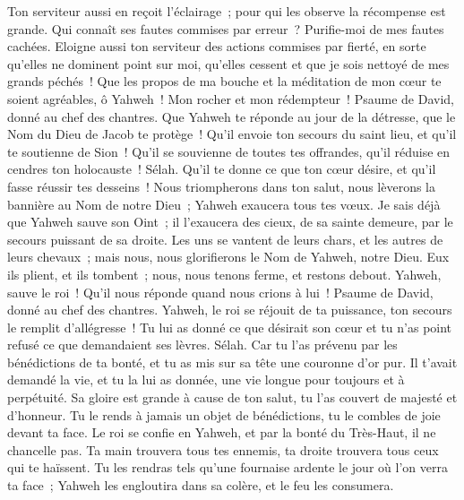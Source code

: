 \begin{multicols}{2}
Ton serviteur aussi en reçoit l'éclairage~; pour qui les observe la récompense est grande.
Qui connaît ses fautes commises par erreur~? Purifie-moi de mes fautes cachées.
Eloigne aussi ton serviteur des actions commises par fierté, en sorte qu'elles ne dominent point sur moi, qu'elles cessent et que je sois nettoyé de mes grands péchés~!
Que les propos de ma bouche et la méditation de mon cœur te soient agréables, ô Yahweh~! Mon rocher et mon rédempteur~!
\VerseOne{}Psaume de David, donné au chef des chantres.
Que Yahweh te réponde au jour de la détresse, que le Nom du Dieu de Jacob te protège~!
Qu'il envoie ton secours du saint lieu, et qu'il te soutienne de Sion~!
Qu'il se souvienne de toutes tes offrandes, qu'il réduise en cendres ton holocauste~! Sélah.
Qu'il te donne ce que ton cœur désire, et qu'il fasse réussir tes desseins~!
Nous triompherons dans ton salut, nous lèverons la bannière au Nom de notre Dieu~; Yahweh exaucera tous tes vœux.
Je sais déjà que Yahweh sauve son Oint~; il l'exaucera des cieux, de sa sainte demeure, par le secours puissant de sa droite.
Les uns se vantent de leurs chars, et les autres de leurs chevaux~; mais nous, nous glorifierons le Nom de Yahweh, notre Dieu.
Eux ils plient, et ils tombent~; nous, nous tenons ferme, et restons debout.
Yahweh, sauve le roi~! Qu'il nous réponde quand nous crions à lui~!
\VerseOne{}Psaume de David, donné au chef des chantres.
Yahweh, le roi se réjouit de ta puissance, ton secours le remplit d'allégresse~!
Tu lui as donné ce que désirait son cœur et tu n'as point refusé ce que demandaient ses lèvres. Sélah.
Car tu l'as prévenu par les bénédictions de ta bonté, et tu as mis sur sa tête une couronne d'or pur.
Il t'avait demandé la vie, et tu la lui as donnée, une vie longue pour toujours et à perpétuité.
Sa gloire est grande à cause de ton salut, tu l'as couvert de majesté et d'honneur.
Tu le rends à jamais un objet de bénédictions, tu le combles de joie devant ta face.
Le roi se confie en Yahweh, et par la bonté du Très-Haut, il ne chancelle pas.
Ta main trouvera tous tes ennemis, ta droite trouvera tous ceux qui te haïssent.
Tu les rendras tels qu'une fournaise ardente le jour où l'on verra ta face~; Yahweh les engloutira dans sa colère, et le feu les consumera.

\end{multicols}
